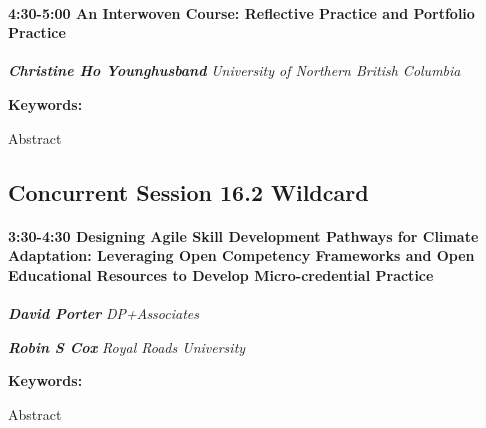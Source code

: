 \documentclass[
]{book}
\begin{document}
\begin{session}
\hypertarget{an-interwoven-course-reflective-practice-and-portfolio-practice}{%
\paragraph*{\texorpdfstring{4:30-5:00 \textbar{} \textbf{An Interwoven
Course: Reflective Practice and Portfolio} \textbar{}
Practice}{4:30-5:00 \textbar{} An Interwoven Course: Reflective Practice and Portfolio \textbar{} Practice}}\label{an-interwoven-course-reflective-practice-and-portfolio-practice}}

\textbf{\emph{Christine Ho Younghusband}} \textbar{} \emph{University of
Northern British Columbia}

\textbf{Keywords:}

Abstract
\end{session}

\hypertarget{concurrent-session-16.2-wildcard}{%
\subsection*{Concurrent Session 16.2 \textbar{} Wildcard}\label{concurrent-session-16.2-wildcard}}

\begin{session}
\hypertarget{designing-agile-skill-development-pathways-for-climate-adaptation-leveraging-open-competency-frameworks-and-open-educational-resources-to-develop-micro-credential-practice}{%
\paragraph*{\texorpdfstring{3:30-4:30 \textbar{} \textbf{Designing Agile
Skill Development Pathways for Climate Adaptation: Leveraging Open
Competency Frameworks and Open Educational Resources to Develop
Micro-credential} \textbar{}
Practice}{3:30-4:30 \textbar{} Designing Agile Skill Development Pathways for Climate Adaptation: Leveraging Open Competency Frameworks and Open Educational Resources to Develop Micro-credential \textbar{} Practice}}\label{designing-agile-skill-development-pathways-for-climate-adaptation-leveraging-open-competency-frameworks-and-open-educational-resources-to-develop-micro-credential-practice}}

\textbf{\emph{David Porter}} \textbar{} \emph{DP+Associates}

\textbf{\emph{Robin S Cox}} \textbar{} \emph{Royal Roads University}

\textbf{Keywords:}

Abstract
\end{session}
\end{document}
